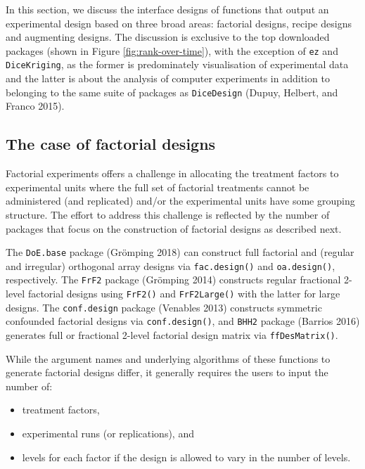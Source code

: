 \documentclass{article}
\providecommand{\tightlist}{%
  \setlength{\itemsep}{0pt}\setlength{\parskip}{0pt}}
\def\tightlist{}
\begin{document}
In this section, we discuss the interface designs of functions that
output an experimental design based on three broad areas: factorial
designs, recipe designs and augmenting designs. The discussion is
exclusive to the top downloaded packages (shown in Figure
\ref{fig:rank-over-time}), with the exception of \texttt{ez} and
\texttt{DiceKriging}, as the former is predominately visualisation of
experimental data and the latter is about the analysis of computer
experiments in addition to belonging to the same suite of packages as
\texttt{DiceDesign} (Dupuy, Helbert, and Franco 2015).

\hypertarget{the-case-of-factorial-designs}{%
\subsection{The case of factorial
designs}\label{the-case-of-factorial-designs}}

Factorial experiments offers a challenge in allocating the treatment
factors to experimental units where the full set of factorial treatments
cannot be administered (and replicated) and/or the experimental units
have some grouping structure. The effort to address this challenge is
reflected by the number of packages that focus on the construction of
factorial designs as described next.

The \texttt{DoE.base} package (Grömping 2018) can construct full
factorial and (regular and irregular) orthogonal array designs via
\texttt{fac.design()} and \texttt{oa.design()}, respectively. The
\texttt{FrF2} package (Grömping 2014) constructs regular fractional
2-level factorial designs using \texttt{FrF2()} and \texttt{FrF2Large()}
with the latter for large designs. The \texttt{conf.design} package
(Venables 2013) constructs symmetric confounded factorial designs via
\texttt{conf.design()}, and \texttt{BHH2} package (Barrios 2016)
generates full or fractional 2-level factorial design matrix via
\texttt{ffDesMatrix()}.

While the argument names and underlying algorithms of these functions to
generate factorial designs differ, it generally requires the users to
input the number of:

\begin{itemize}
\tightlist
\item
  treatment factors,
\item
  experimental runs (or replications), and
\item
  levels for each factor if the design is allowed to vary in the number
  of levels.
\end{itemize}
\end{document}
